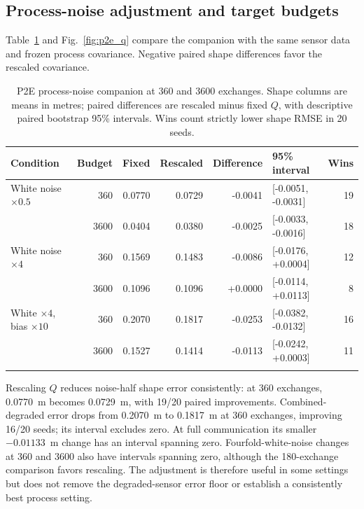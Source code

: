 \subsection{Process-noise adjustment and target budgets}
Table~\ref{tab:p2e_q} and Fig.~\ref{fig:p2e_q} compare the companion with the same sensor data and frozen process covariance. Negative paired shape differences favor the rescaled covariance.
\begin{table}[htbp]
\centering\small
\setlength{\tabcolsep}{4pt}
\caption{P2E process-noise companion at 360 and 3600 exchanges. Shape columns are means in metres; paired differences are rescaled minus fixed \(Q\), with descriptive paired bootstrap 95\% intervals. Wins count strictly lower shape RMSE in 20 seeds.}
\label{tab:p2e_q}
\begin{tabular}{lrrrrlr}
\toprule
Condition & Budget & Fixed & Rescaled & Difference & 95\% interval & Wins \\
\midrule
White noise $\times0.5$ & 360 & 0.0770 & 0.0729 & -0.0041 & [-0.0051, -0.0031] & 19 \\
 & 3600 & 0.0404 & 0.0380 & -0.0025 & [-0.0033, -0.0016] & 18 \\
\addlinespace
White noise $\times4$ & 360 & 0.1569 & 0.1483 & -0.0086 & [-0.0176, +0.0004] & 12 \\
 & 3600 & 0.1096 & 0.1096 & +0.0000 & [-0.0114, +0.0113] & 8 \\
\addlinespace
White $\times4$, bias $\times10$ & 360 & 0.2070 & 0.1817 & -0.0253 & [-0.0382, -0.0132] & 16 \\
 & 3600 & 0.1527 & 0.1414 & -0.0113 & [-0.0242, +0.0003] & 11 \\
\addlinespace
\bottomrule
\end{tabular}
\end{table}

Rescaling \(Q\) reduces noise-half shape error consistently: at 360 exchanges, \SI{0.0770}{m} becomes \SI{0.0729}{m}, with 19/20 paired improvements. Combined-degraded error drops from \SI{0.2070}{m} to \SI{0.1817}{m} at 360 exchanges, improving 16/20 seeds; its interval excludes zero. At full communication its smaller \(-0.01133\)~m change has an interval spanning zero. Fourfold-white-noise changes at 360 and 3600 also have intervals spanning zero, although the 180-exchange comparison favors rescaling. The adjustment is therefore useful in some settings but does not remove the degraded-sensor error floor or establish a consistently best process setting.

